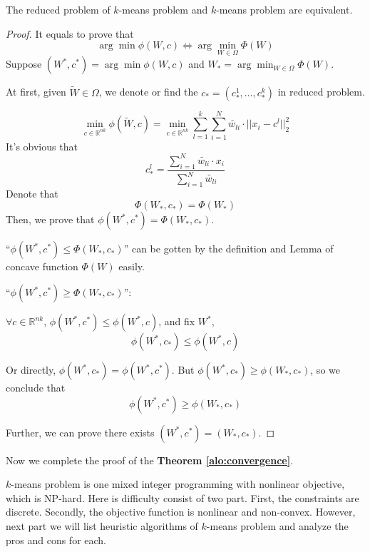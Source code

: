 	\begin{lemma}
	The reduced problem of $k$-means problem and $k$-means problem are equivalent.
	\end{lemma}
	
	\begin{proof}
	It equals to prove that 
	\begin{equation}\label{eq: 4}
	{\arg\min} \phi(W, c) \iff \arg\min_{W \in \Omega} \Phi(W)
	\end{equation}
	Suppose  $(W^{*}, c^{*}) = {\arg\min} \phi(W, c)$ and $W_{*} = \arg\min_{W \in \Omega} \Phi(W)$.
	
	At first, given $\tilde W \in \Omega$, we denote or find the $c_{*}= (c_{*}^{1}, \dots, c_{*}^{k})$ in reduced problem.
	 	
	\begin{equation}
	\min_{c \in \mathbb{R}^{nk}} \phi(\tilde W, c) = \min_{c \in \mathbb{R}^{nk}} {\sum_{l=1}^{k}\sum_{i=1}^{N}} \tilde{w_{li}} \cdot ||x_{i} - c^{l}||^{2}_{2}
	\end{equation}
	It's obvious that
	\begin{equation}
	c_{*}^{l} = \frac{\sum_{i=1}^{N} \tilde{w_{li}}\cdot x_{i}}{\sum_{i=1}^{N} \tilde{w_{li}}} 
        \end{equation} 	
	Denote that 
	\[\Phi(W_{*}, c_{*}) = \Phi(W_{*})\]
	Then, we prove that $\phi (W^{*}, c^{*}) = \Phi(W_{*}, c_{*})$.
	
	``$\phi (W^{*}, c^{*}) \leq \Phi(W_{*}, c_{*})$'' can be gotten by the definition and Lemma of concave function $\Phi(W)$ easily.
		
	``$\phi (W^{*}, c^{*}) \geq \Phi(W_{*}, c_{*})$'':
	
	$\forall c \in \mathbb{R}^{nk}$, $\phi(W^{*}, c^{*}) \leq \phi(W^{*}, c)$, and fix $W^{*}$, 
	\[\phi(W^{*}, c_{*}) \leq \phi(W^{*}, c)\]
	
	Or directly, $\phi(W^{*}, c_{*}) = \phi(W^{*}, c^{*})$. But $\phi(W^{*}, c_{*}) \geq \phi(W_{*}, c_{*})$, so we conclude that 
	\[\phi(W^{*}, c^{*}) \geq \phi(W_{*}, c_{*})\] 
	
	Further, we can prove there exists $(W^{*}, c^{*}) = (W_{*}, c_{*})$.
		
	\end{proof}
	
	Now we complete the proof of the \textbf{Theorem \ref{alo:convergence}}.
	
	$k$-means problem is one mixed integer programming with nonlinear objective, which is NP-hard. Here is difficulty consist of two part. First, the constraints are discrete. Secondly, the objective function is nonlinear and non-convex. However, next part we will list heuristic algorithms of $k$-means problem and analyze the pros and cons for each.


